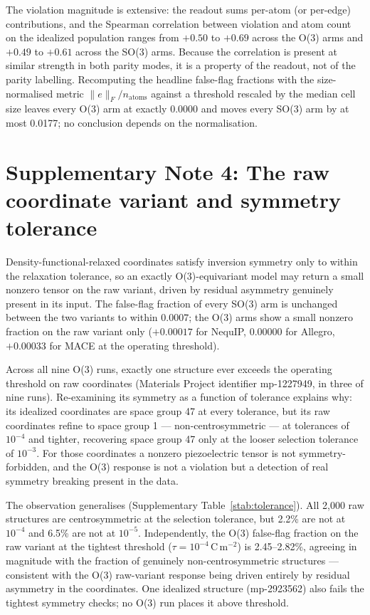 The violation magnitude is extensive: the readout sums per-atom (or per-edge) contributions, and the Spearman correlation between violation and atom count on the idealized population ranges from $+0.50$ to $+0.69$ across the O(3) arms and $+0.49$ to $+0.61$ across the SO(3) arms. Because the correlation is present at similar strength in both parity modes, it is a property of the readout, not of the parity labelling. Recomputing the headline false-flag fractions with the size-normalised metric $\lVert e \rVert_F / n_{\mathrm{atoms}}$ against a threshold rescaled by the median cell size leaves every O(3) arm at exactly 0.0000 and moves every SO(3) arm by at most 0.0177; no conclusion depends on the normalisation.

\section*{Supplementary Note 4: The raw coordinate variant and symmetry tolerance}

Density-functional-relaxed coordinates satisfy inversion symmetry only to within the relaxation tolerance, so an exactly O(3)-equivariant model may return a small nonzero tensor on the raw variant, driven by residual asymmetry genuinely present in its input. The false-flag fraction of every SO(3) arm is unchanged between the two variants to within $0.0007$; the O(3) arms show a small nonzero fraction on the raw variant only ($+0.00017$ for NequIP, $0.00000$ for Allegro, $+0.00033$ for MACE at the operating threshold).

Across all nine O(3) runs, exactly one structure ever exceeds the operating threshold on raw coordinates (Materials Project identifier mp-1227949, in three of nine runs). Re-examining its symmetry as a function of tolerance explains why: its idealized coordinates are space group 47 at every tolerance, but its raw coordinates refine to space group 1 --- non-centrosymmetric --- at tolerances of $10^{-4}$ and tighter, recovering space group 47 only at the looser selection tolerance of $10^{-3}$. For those coordinates a nonzero piezoelectric tensor is not symmetry-forbidden, and the O(3) response is not a violation but a detection of real symmetry breaking present in the data.

The observation generalises (Supplementary Table~\ref{stab:tolerance}). All 2,000 raw structures are centrosymmetric at the selection tolerance, but 2.2\% are not at $10^{-4}$ and 6.5\% are not at $10^{-5}$. Independently, the O(3) false-flag fraction on the raw variant at the tightest threshold ($\tau = 10^{-4}$\,C\,m$^{-2}$) is 2.45--2.82\%, agreeing in magnitude with the fraction of genuinely non-centrosymmetric structures --- consistent with the O(3) raw-variant response being driven entirely by residual asymmetry in the coordinates. One idealized structure (mp-2923562) also fails the tightest symmetry checks; no O(3) run places it above threshold.


